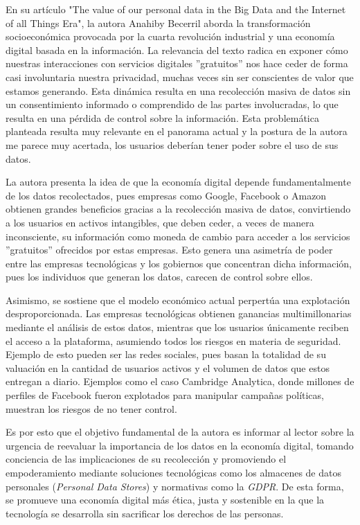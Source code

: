 
En su artículo "The value of our personal data in the Big Data and the Internet of all Things Era", la autora Anahiby Becerril aborda la transformación socioeconómica provocada por la cuarta revolución industrial y una economía digital basada en la información. La relevancia del texto radica en exponer cómo nuestras interacciones con servicios digitales ''gratuitos'' nos hace ceder de forma casi involuntaria nuestra privacidad, muchas veces sin ser conscientes de valor que estamos generando. Esta dinámica resulta en una recolección masiva de datos sin un consentimiento informado o comprendido de las partes involucradas, lo que resulta en una pérdida de control sobre la información. Esta problemática planteada resulta muy relevante en el panorama actual y la postura de la autora me parece muy acertada, los usuarios deberían tener poder sobre el uso de sus datos.

La autora presenta la idea de que la economía digital depende fundamentalmente de los datos recolectados, pues empresas como Google, Facebook o Amazon obtienen grandes beneficios gracias a la recolección masiva de datos, convirtiendo a los usuarios en activos intangibles, que deben ceder, a veces de manera inconsciente, su información como moneda de cambio para acceder a los servicios ''gratuitos'' ofrecidos por estas empresas. Esto genera una asimetría de poder entre las empresas tecnológicas y los gobiernos que concentran dicha información, pues los individuos que generan los datos, carecen de control sobre ellos. 

Asimismo, se sostiene que el modelo económico actual perpertúa una explotación desproporcionada. Las empresas tecnológicas obtienen ganancias multimillonarias mediante el análisis de estos datos, mientras que los usuarios únicamente reciben el acceso a la plataforma, asumiendo todos los riesgos en materia de seguridad. Ejemplo de esto pueden ser las redes sociales, pues basan la totalidad de su valuación en la cantidad de usuarios activos y el volumen de datos que estos entregan a diario. Ejemplos como el caso Cambridge Analytica, donde millones de perfiles de Facebook fueron explotados para manipular campañas políticas, muestran los riesgos de no tener control.

Es por esto que el objetivo fundamental de la autora es informar al lector sobre la urgencia de reevaluar la importancia de los datos en la economía digital, tomando conciencia de las implicaciones de su recolección y promoviendo el empoderamiento mediante soluciones tecnológicas como los almacenes de datos personales (\textit{Personal Data Stores}) y normativas como la \textit{GDPR}. De esta forma, se promueve una economía digital más ética, justa y sostenible en la que la tecnología se desarrolla sin sacrificar los derechos de las personas.

